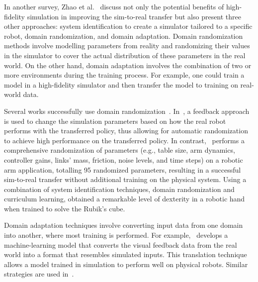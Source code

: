 In another survey, Zhao et al.~\cite{zhao2020sim} discuss not only the potential benefits of high-fidelity simulation in improving the sim-to-real transfer but also present three other approaches: system identification to create a simulator tailored to a specific robot, domain randomization, and domain adaptation. Domain randomization methods involve modelling parameters from reality and randomizing their values in the simulator to cover the actual distribution of these parameters in the real world. On the other hand, domain adaptation involves the combination of two or more environments during the training process. For example, one could train a model in a high-fidelity simulator and then transfer the model to training on real-world data.

Several works successfully use domain randomization~\cite{huber2024domain,peng2018sim,akkaya2019solving}. In~\cite{huber2024domain}, a feedback approach is used to change the simulation parameters based on how the real robot performs with the transferred policy, thus allowing for automatic randomization to achieve high performance on the transferred policy. In contrast,~\cite{peng2018sim} performs a comprehensive randomization of parameters (e.g., table size, arm dynamics, controller gains, links' mass, friction, noise levels, and time steps) on a robotic arm application, %
totalling 95 randomized parameters, resulting in a successful sim-to-real transfer without additional training on the physical system. Using a combination of system identification techniques, domain randomization and curriculum learning, \cite{akkaya2019solving} obtained a remarkable level of dexterity in a robotic hand when trained to solve the Rubik's cube.


Domain adaptation techniques involve converting input data from one domain into another, where most training is performed. For example,~\cite{james2019sim} develops a machine-learning model that converts the visual feedback data from the real world into a format that resembles simulated inputs. This translation technique allows a model trained in simulation to perform well on physical robots. Similar strategies are used in~\cite{bousmalis2018using}.

